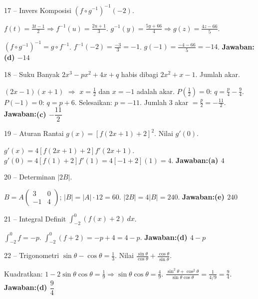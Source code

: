 \documentclass[11pt]{article}
\newcommand{\jawaban}[1]{\textbf{Jawaban:}\enspace\colorbox{gold!30}{\textbf{#1}}}
\begin{document}
\begin{soal}{17 -- Invers Komposisi}
$(f\circ g^{-1})^{-1}(-2)$.
\end{soal}
\begin{pembox}
$f(t)=\frac{3t-1}{2}\Rightarrow f^{-1}(u)=\frac{2u+1}{3}$. $g^{-1}(y)=\frac{5y+66}{4}\Rightarrow g(z)=\frac{4z-66}{5}$.

$(f\circ g^{-1})^{-1}=g\circ f^{-1}$. $f^{-1}(-2)=\frac{-3}{3}=-1$. $g(-1)=\frac{-4-66}{5}=-14$.
\jawaban{(d) $-14$}
\end{pembox}

\begin{soal}{18 -- Suku Banyak}
$2x^3-px^2+4x+q$ habis dibagi $2x^2+x-1$. Jumlah akar.
\end{soal}
\begin{pembox}
$(2x-1)(x+1)$ $\Rightarrow$ $x=\frac12$ dan $x=-1$ adalah akar.
$P(\frac12)=0$: $q=\frac p4-\frac94$. $P(-1)=0$: $q=p+6$. Selesaikan: $p=-11$.
Jumlah 3 akar $=\frac{p}{2}=-\frac{11}{2}$.
\jawaban{(c) $-\dfrac{11}{2}$}
\end{pembox}

\begin{soal}{19 -- Aturan Rantai}
$g(x)=[f(2x+1)+2]^2$. Nilai $g'(0)$.
\end{soal}
\begin{pembox}
$g'(x)=4[f(2x+1)+2]f'(2x+1)$.
$g'(0)=4[f(1)+2]f'(1)=4[-1+2](1)=4$.
\jawaban{(a) $4$}
\end{pembox}

\begin{soal}{20 -- Determinan}
$|2B|$.
\end{soal}
\begin{pembox}
$B=A\begin{pmatrix}3&0\\-1&4\end{pmatrix}$; $|B|=|A|\cdot12=60$. $|2B|=4|B|=240$.
\jawaban{(e) $240$}
\end{pembox}

\begin{soal}{21 -- Integral Definit}
$\int_{-2}^0(f(x)+2)\,dx$.
\end{soal}
\begin{pembox}
$\int_{-2}^0f=-p$. $\int_{-2}^0(f+2)=-p+4=4-p$.
\jawaban{(d) $4-p$}
\end{pembox}

\begin{soal}{22 -- Trigonometri}
$\sin\theta-\cos\theta=\frac13$. Nilai $\frac{\sin\theta}{\cos\theta}+\frac{\cos\theta}{\sin\theta}$.
\end{soal}
\begin{pembox}
Kuadratkan: $1-2\sin\theta\cos\theta=\frac19\Rightarrow\sin\theta\cos\theta=\frac49$.
$\frac{\sin^2\theta+\cos^2\theta}{\sin\theta\cos\theta}=\frac{1}{4/9}=\frac94$.
\jawaban{(d) $\dfrac94$}
\end{pembox}
\end{document}
